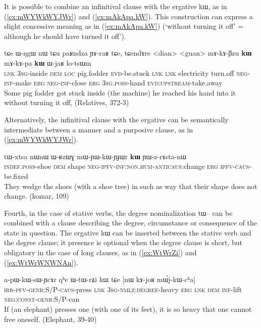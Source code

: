 \documentclass[oldfontcommands,oneside,a4paper,11pt]{article}
\newcommand{\ipa}[1]{{\phon \mbox{#1}}} %
\newcommand{\refb}[1]{(\ref{#1})}
\begin{document}
 


It is possible to combine an infinitival clause with the ergative \ipa{kɯ}, as in  \refb{ex:mWYWkWYJWr} and \refb{ex:mAkApa.kW}.  This construction can express  a slight concessive meaning as in \refb{ex:mAkApa.kW} (`without turning it off' =  although he should have turned it off').

\begin{exe}
\ex \label{ex:mAkApa.kW}
\gll
\ipa{tɕe}   	\ipa{ɯ-ŋgɯ}   	\ipa{nɯ} \ipa{tɕu}   	\ipa{paʁndza}   	\ipa{ɲɤ-raʁ}   	\ipa{tɕe,}   	\ipa{tɕendɤre}   	<dian>   	<guan>   	\ipa{mɤ-kɤ-βzu} 	\ipa{\textbf{kɯ}}   	\ipa{mɤ-kɤ-pa}   	\ipa{\textbf{kɯ}}   	\ipa{ɯ-jaʁ}   	\ipa{lo-tsɯm}   \\
\textsc{lnk} \textsc{3sg}-inside \textsc{dem} \textsc{loc} pig.fodder \textsc{evd}-be.stuck \textsc{lnk}
\textsc{lnk} electricity turn.off \textsc{neg-inf}-make \textsc{erg}  \textsc{neg-inf}-close \textsc{erg}  \textsc{3sg.poss}-hand \textsc{evd:upstream}-take.away \\
\glt Some pig fodder got stuck inside (the machine) he reached his hand into it without turning it off, (Relatives, 372-3)
\end{exe} 
 
Alternatively, the infinitival clause with the ergative can be semantically intermediate between a manner and a purposive clause, as in \refb{ex:mWYWkWYJWr}.

\begin{exe}
\ex \label{ex:mWYWkWYJWr}
\gll
\ipa{tɯ-xtsa}   	\ipa{nɯnɯ}   	\ipa{ɯ-ʁzɯɣ}   	\ipa{mɯ-ɲɯ-kɯ-ɲɟɯr}   	\ipa{\textbf{kɯ}}   	\ipa{ɲɯ-z-rɤsta-nɯ}   \\
\textsc{indef.poss}-shoe \textsc{dem} shape \textsc{neg-ipfv-inf:non.hum-anticaus}:change \textsc{erg} \textsc{ipfv-caus}-be.fixed \\
\glt They wedge the shoes (with a shoe tree)  in such as way that their shape does not change. (komar, 109)
\end{exe}

Fourth, in the case of stative verbs, the degree nominalization \ipa{tɯ--} can be combined with   a   clause    describing the degree, circumstance or   consequence of the state in question. The ergative \ipa{kɯ} can be   inserted between the stative verb and the degree clause; it presence is optional when the degree clause is short, but obligatory in the case of long clauses, as in \refb{ex:WtWrZi} and \refb{ex:WtWrWNWNAn}.
 

\begin{exe}
\ex \label{ex:WtWrZi}
\gll
\ipa{a-pɯ-kɯ-sɯ-ɲcɤr}         	\ipa{qʰe}         	\ipa{ɯ-tɯ-rʑi}         	\ipa{kɯ}         \ipa{tɕe}         	[\ipa{nɯ}         	\ipa{kɤ-joʁ}         	\ipa{mɯ́j-kɯ-cʰa}]         \\
\textsc{irr-pfv-genr:S/P-caus}-press \textsc{lnk} \textsc{3sg-nmlz:degree}-heavy \textsc{erg} \textsc{lnk} \textsc{dem} \textsc{inf}-lift \textsc{neg:const-genr:S/P}-can \\
\glt If (an elephant) presses one (with one of its feet), it is so heavy that one cannot free oneself. (Elephant, 39-40)
\end{exe}
\end{document}

